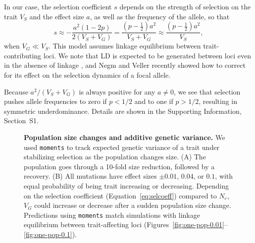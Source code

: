 \documentclass[10pt,letterpaper]{article}
\newcommand{\moments}{\texttt{moments}\xspace}
\begin{document}
In our case, the selection coefficient $s$ depends on the strength of selection
on the trait $V_S$ and the effect size $a$, as well as the frequency of the
allele, so that
\begin{equation}\label{eq:selcoeff}
    s\approx -\frac{a^2(1-2p)}{2(V_S+V_G)} 
    = \frac{\left(p-\frac{1}{2}\right)a^2}{V_S + V_G}
    \approx \frac{\left(p-\frac{1}{2}\right)a^2}{V_S},
\end{equation}
when $V_G \ll V_S$. This model assumes linkage equilibrium between
trait-contributing loci. We note that LD is expected to be generated between
loci even in the absence of linkage \cite{bulmer1971effect}, and
Negm and Veller \cite{negm2024effect} recently showed how to
correct for its effect on the selection dynamics of a focal allele.

Because $a^2/(V_S+V_G)$ is always positive for any $a\not=0$, we see that
selection pushes allele frequencies to zero if $p<1/2$ and to one if $p>1/2$,
resulting in symmetric underdominance. Details are shown in the Supporting
Information, Section~S1.

\begin{figure}[tb!]
    \centering
    \caption{
        \textbf{Population size changes and additive genetic variance.}
        We used \moments to track expected genetic variance of a trait
        under stabilizing selection as the population changes size. (A) The
        population goes through a 10-fold size reduction, followed by a recovery.
        (B) All mutations have effect sizes $\pm0.01$, $0.04$, or $0.1$, with equal
        probability of being trait increasing or decreasing. Depending on the
        selection coefficient (Equation~\ref{eq:selcoeff}) compared to $N_e$, $V_G$
        could increase or decrease after a sudden population size change.
        Predictions using \moments match simulations with linkage equilibrium
        between trait-affecting loci
        (Figures~\ref{fig:one-pop-0.01}--\ref{fig:one-pop-0.1}).
    }
    \label{fig:one-pop}
\end{figure}
\end{document}
